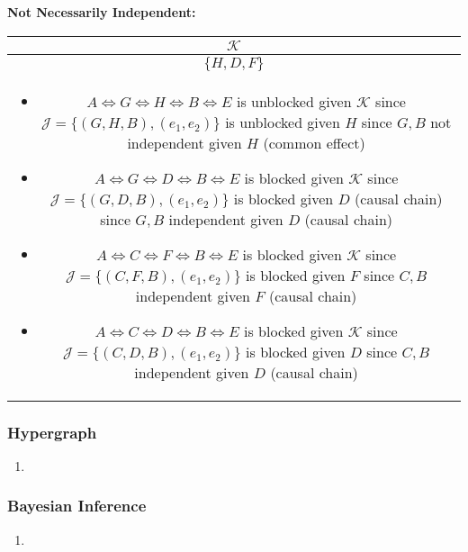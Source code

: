 \begin{example}
    \textbf{Not Necessarily Independent:}
    \begin{center}
        \begin{tabular}{c}
            \toprule
            $\mathcal{K}$ \\
            \midrule
            $\{H,D,F\}$ \\
            \multicolumn{1}{p{\linewidth}}{
                \begin{itemize}
                    \item $A \iff G \iff H \iff B \iff E$ is unblocked given $\mathcal{K}$ since $\mathcal{J} = \{(G,H,B),(e_1,e_2)\}$ is unblocked given $H$ since $G,B$ not independent given $H$ (common effect)
                    \item $A \iff G \iff D \iff B \iff E$ is blocked given $\mathcal{K}$ since $\mathcal{J} = \{(G,D,B),(e_1,e_2)\}$ is blocked given $D$ (causal chain) since $G,B$ independent given $D$ (causal chain)
                    \item $A \iff C \iff F \iff B \iff E$ is blocked given $\mathcal{K}$ since $\mathcal{J} = \{(C,F,B),(e_1,e_2)\}$ is blocked given $F$ since $C,B$ independent given $F$ (causal chain)
                    \item $A \iff C \iff D \iff B \iff E$  is blocked given $\mathcal{K}$ since $\mathcal{J} = \{(C,D,B),(e_1,e_2)\}$ is blocked given $D$ since $C,B$ independent given $D$ (causal chain)
                \end{itemize}} \\
            \midrule
            \toprule
        \end{tabular}
    \end{center}
\end{example}
\newpage

\subsubsection{Hypergraph}
\begin{process}
    \begin{enumerate}
        \item 
    \end{enumerate}
\end{process}

\subsubsection{Bayesian Inference}
\begin{process}
    \begin{enumerate}
        \item 
    \end{enumerate}
\end{process}

